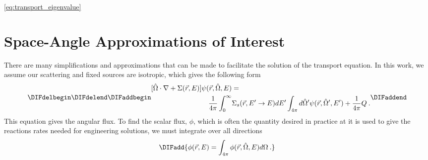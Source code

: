 \eqref{eq:transport_eigenvalue} 


\DIFaddend \section{Space-Angle Approximations of Interest}
There are many simplifications and approximations that can be made to facilitate the solution of the transport equation. In this work, we assume our scattering and fixed sources are isotropic, which gives the following form
%
\begin{equation}
\DIFdelbegin %


\DIFdelend \DIFaddbegin \begin{split}
 [\hat{\Omega} \cdot \nabla + \Sigma(\vec{r}, E)]\psi(\vec{r}, \hat{\Omega}, E) &= \\ \frac{1}{4\pi}  \int_0^\infty &\Sigma_s(\vec{r}, E' \rightarrow E)  dE' \int_{4\pi} d\hat{\Omega}'\psi(\vec{r}, \hat{\Omega}', E')  + \frac{1}{4\pi}Q \:.
\end{split}
 \DIFaddend \label{eq:transport_isotropic_scattering}
\end{equation}
%
This equation gives the angular flux. To find the scalar flux, $\phi$, which is often the quantity desired in practice at it is used to give the reactions rates needed for engineering solutions, we must integrate over all directions
\DIFaddbegin \begin{equation}
    \DIFadd{\phi(\vec{r}, E) = \int_{4\pi} \phi(\vec{r}, \hat{\Omega}, E) d \Omega \:.
}\end{equation}
\DIFaddend 

